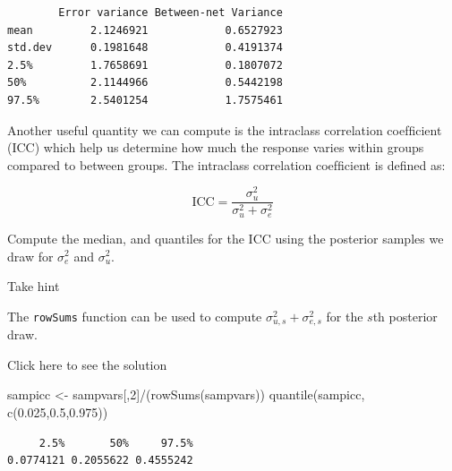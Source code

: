 \documentclass[
  letterpaper,
  DIV=11,
  numbers=noendperiod]{scrartcl}
\newenvironment{Shaded}{\begin{snugshade}}{\end{snugshade}}
\newcommand{\DecValTok}[1]{\textcolor[rgb]{0.68,0.00,0.00}{#1}}
\newcommand{\FloatTok}[1]{\textcolor[rgb]{0.68,0.00,0.00}{#1}}
\newcommand{\FunctionTok}[1]{\textcolor[rgb]{0.28,0.35,0.67}{#1}}
\newcommand{\NormalTok}[1]{\textcolor[rgb]{0.00,0.23,0.31}{#1}}
\newcommand{\OtherTok}[1]{\textcolor[rgb]{0.00,0.23,0.31}{#1}}
\newcommand{\SpecialCharTok}[1]{\textcolor[rgb]{0.37,0.37,0.37}{#1}}
\begin{document}
\begin{verbatim}
        Error variance Between-net Variance
mean         2.1246921            0.6527923
std.dev      0.1981648            0.4191374
2.5%         1.7658691            0.1807072
50%          2.1144966            0.5442198
97.5%        2.5401254            1.7575461
\end{verbatim}

\begin{tcolorbox}[enhanced jigsaw, title={Task}, bottomrule=.15mm, toptitle=1mm, colbacktitle=quarto-callout-warning-color!10!white, opacitybacktitle=0.6, opacityback=0, rightrule=.15mm, colframe=quarto-callout-warning-color-frame, coltitle=black, toprule=.15mm, arc=.35mm, breakable, bottomtitle=1mm, titlerule=0mm, left=2mm, leftrule=.75mm, colback=white]

Another useful quantity we can compute is the intraclass correlation
coefﬁcient (ICC) which help us determine how much the response varies
within groups compared to between groups. The intraclass correlation
coefﬁcient is defined as:

\[
\text{ICC} = \frac{\sigma^2_u}{\sigma^2_u + \sigma^2_e}
\]

Compute the median, and quantiles for the ICC using the posterior
samples we draw for \(\sigma^2_e\) and \(\sigma^2_u\).

Take hint

The \texttt{rowSums} function can be used to compute
\(\sigma^2_{u,s} + \sigma^2_{e,s}\) for the \(s\)th posterior draw.

Click here to see the solution

\begin{Shaded}
\begin{Highlighting}[]
\NormalTok{sampicc }\OtherTok{\textless{}{-}}\NormalTok{ sampvars[,}\DecValTok{2}\NormalTok{]}\SpecialCharTok{/}\NormalTok{(}\FunctionTok{rowSums}\NormalTok{(sampvars))}
\FunctionTok{quantile}\NormalTok{(sampicc, }\FunctionTok{c}\NormalTok{(}\FloatTok{0.025}\NormalTok{,}\FloatTok{0.5}\NormalTok{,}\FloatTok{0.975}\NormalTok{))}
\end{Highlighting}
\end{Shaded}

\begin{verbatim}
     2.5%       50%     97.5% 
0.0774121 0.2055622 0.4555242 
\end{verbatim}

\end{tcolorbox}
\end{document}
